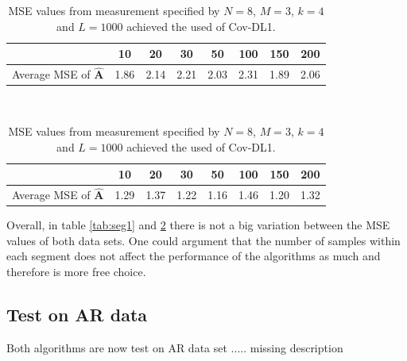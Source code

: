 \begin{table}[H]
\centering
\begin{minipage}{.45\textwidth}
\centering
\begin{tabular}{|c|c|c|c|c|c|c|c|}
\hline 
& 10 & 20 & 30 & 50 & 100 & 150 & 200 \\ 
\hline 
Average MSE of $\hat{\mathbf{A}}$ & 1.86 & 2.14 & 2.21 & 2.03 & 2.31 & 1.89 & 2.06 \\ 
\hline
\end{tabular} 
\caption{MSE values from measurement specified by $N=5$, $M = 3$, $k = 4$ and $L = 1000$ achieved from the used of Cov-DL2}
\label{tab:seg1}
\end{minipage}
\\
\begin{minipage}{.45\textwidth}
\centering
\begin{tabular}{|c|c|c|c|c|c|c|c|}
\hline 
& 10 & 20 & 30 & 50 & 100 & 150 & 200 \\ 
\hline 
Average MSE of $\hat{\mathbf{A}}$ & 1.29 & 1.37 & 1.22 & 1.16 & 1.46 & 1.20 & 1.32 \\ 
\hline
\end{tabular} 
\caption{MSE values from measurement specified by $N=8$, $M = 3$, $k = 4$ and $L = 1000$ achieved the used of Cov-DL1.}
\label{tab:seg2}
\end{minipage}
\end{table}
\noindent
Overall, in table \ref{tab:seg1} and \ref{tab:seg2} there is not a big variation between the MSE values of both data sets. One could argument that the number of samples within each segment does not affect the performance of the algorithms as much and therefore is more free choice.

\subsection{Test on AR data}
Both algorithms are now test on AR data set ..... missing description


